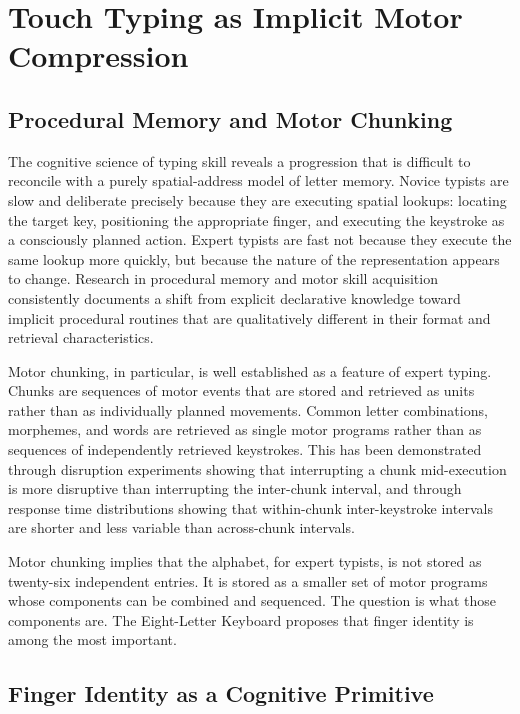 \documentclass[12pt,a4paper]{article}
\theoremstyle{plain}
\theoremstyle{definition}
\theoremstyle{remark}
\begin{document}
\section{Touch Typing as Implicit Motor Compression}

\subsection{Procedural Memory and Motor Chunking}

The cognitive science of typing skill reveals a progression that is difficult to
reconcile with a purely spatial-address model of letter memory. Novice typists
are slow and deliberate precisely because they are executing spatial lookups:
locating the target key, positioning the appropriate finger, and executing the
keystroke as a consciously planned action. Expert typists are fast not because
they execute the same lookup more quickly, but because the nature of the
representation appears to change. Research in procedural memory and motor skill
acquisition consistently documents a shift from explicit declarative knowledge
toward implicit procedural routines that are qualitatively different in their
format and retrieval characteristics.

Motor chunking, in particular, is well established as a feature of expert typing.
Chunks are sequences of motor events that are stored and retrieved as units rather
than as individually planned movements. Common letter combinations, morphemes, and
words are retrieved as single motor programs rather than as sequences of
independently retrieved keystrokes. This has been demonstrated through disruption
experiments showing that interrupting a chunk mid-execution is more disruptive
than interrupting the inter-chunk interval, and through response time
distributions showing that within-chunk inter-keystroke intervals are shorter and
less variable than across-chunk intervals.

Motor chunking implies that the alphabet, for expert typists, is not stored as
twenty-six independent entries. It is stored as a smaller set of motor programs
whose components can be combined and sequenced. The question is what those
components are. The Eight-Letter Keyboard proposes that finger identity is among
the most important.

\subsection{Finger Identity as a Cognitive Primitive}
\end{document}
